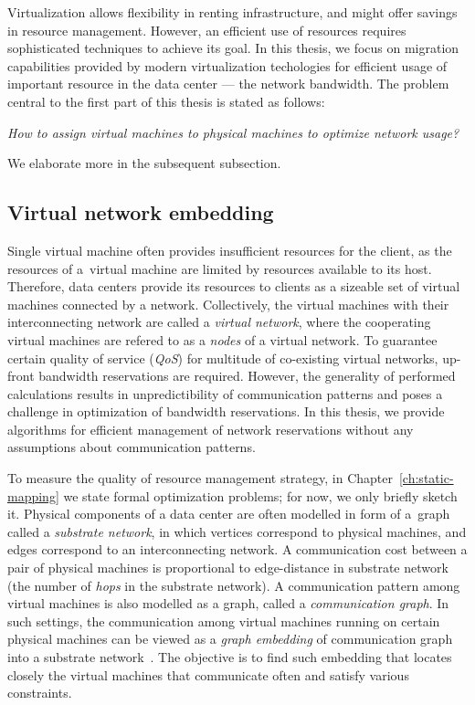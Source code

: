 Virtualization allows flexibility in renting infrastructure, and might offer savings in resource management.
However, an efficient use of resources requires sophisticated techniques to achieve its goal.
In this thesis, we focus on migration capabilities provided by modern virtualization techologies for efficient usage of important resource in the data center --- the network bandwidth.
The problem central to the first part of this thesis is stated as follows:

\begin{center}
  \emph{How to assign virtual machines to physical machines to optimize network
  usage?}
\end{center}

We elaborate more in the subsequent subsection.

\subsection{Virtual network embedding}

Single virtual machine often provides insufficient resources for the client, as the resources of a~virtual machine are limited by resources available to its host.
Therefore, data centers provide its resources to clients as a sizeable set of virtual machines connected by a network.
Collectively, the virtual machines with their interconnecting network are called a \emph{virtual network}, where the cooperating virtual machines are refered to as a \emph{nodes} of a virtual network.
To guarantee certain quality of service (\emph{QoS}) for multitude of co-existing virtual networks, up-front bandwidth reservations are required.
However, the generality of performed calculations results in unpredictibility of communication patterns and poses a challenge in optimization of bandwidth reservations.
In this thesis, we provide algorithms for efficient management of network reservations without any assumptions about communication patterns.

To measure the quality of resource management strategy, in Chapter~\ref{ch:static-mapping} we state formal optimization problems; for now, we only briefly sketch it.
Physical components of a data center are often modelled in form of a~graph called a \emph{substrate network}, in which vertices correspond to physical machines, and edges correspond to an interconnecting network.
A communication cost between a pair of physical machines is proportional to edge-distance in substrate network (the number of \emph{hops} in the substrate network).
A communication pattern among virtual machines is also modelled as a graph, called a \emph{communication graph}.
In such settings, the communication among virtual machines running on certain physical machines can be viewed as a \emph{graph embedding} of communication graph into a substrate network~\cite{Goyal2008,gupta2001provisioning}.
The objective is to find such embedding that locates closely the virtual machines that communicate often and satisfy various constraints.

